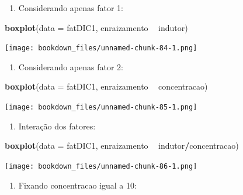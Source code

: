 \documentclass[
]{article}
\newenvironment{Shaded}{\begin{snugshade}}{\end{snugshade}}
\newcommand{\DataTypeTok}[1]{\textcolor[rgb]{0.13,0.29,0.53}{#1}}
\newcommand{\KeywordTok}[1]{\textcolor[rgb]{0.13,0.29,0.53}{\textbf{#1}}}
\newcommand{\NormalTok}[1]{#1}
\newcommand{\OperatorTok}[1]{\textcolor[rgb]{0.81,0.36,0.00}{\textbf{#1}}}
\newcommand{\StringTok}[1]{\textcolor[rgb]{0.31,0.60,0.02}{#1}}
\providecommand{\tightlist}{%
  \setlength{\itemsep}{0pt}\setlength{\parskip}{0pt}}
\begin{document}
\begin{enumerate}
\def\labelenumi{\arabic{enumi}.}
\tightlist
\item
  Considerando apenas fator 1:
\end{enumerate}

\begin{Shaded}
\begin{Highlighting}[]
\KeywordTok{boxplot}\NormalTok{(}\DataTypeTok{data =}\NormalTok{ fatDIC1, enraizamento }\OperatorTok{~}\StringTok{ }\NormalTok{indutor)}
\end{Highlighting}
\end{Shaded}

\texttt{[image: bookdown\_files/unnamed-chunk-84-1.png]}

\begin{enumerate}
\def\labelenumi{\arabic{enumi}.}
\setcounter{enumi}{1}
\tightlist
\item
  Considerando apenas fator 2:
\end{enumerate}

\begin{Shaded}
\begin{Highlighting}[]
\KeywordTok{boxplot}\NormalTok{(}\DataTypeTok{data =}\NormalTok{ fatDIC1, enraizamento }\OperatorTok{~}\StringTok{ }\NormalTok{concentracao)}
\end{Highlighting}
\end{Shaded}

\texttt{[image: bookdown\_files/unnamed-chunk-85-1.png]}

\begin{enumerate}
\def\labelenumi{\arabic{enumi}.}
\setcounter{enumi}{2}
\tightlist
\item
  Interação dos fatores:
\end{enumerate}

\begin{Shaded}
\begin{Highlighting}[]
\KeywordTok{boxplot}\NormalTok{(}\DataTypeTok{data =}\NormalTok{ fatDIC1, enraizamento }\OperatorTok{~}\StringTok{ }\NormalTok{indutor}\OperatorTok{/}\NormalTok{concentracao)}
\end{Highlighting}
\end{Shaded}

\texttt{[image: bookdown\_files/unnamed-chunk-86-1.png]}

\begin{enumerate}
\def\labelenumi{\arabic{enumi}.}
\setcounter{enumi}{3}
\tightlist
\item
  Fixando concentracao igual a 10:
\end{enumerate}
\end{document}
